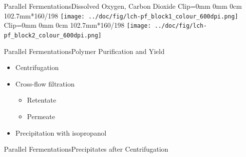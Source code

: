 \documentclass[mathserif]{beamer}
\begin{document}
\begin{frame}{Parallel Fermentations}{Dissolved Oxygen, Carbon Dioxide}
	\adjustbox
	{
		Clip=0mm 0mm 0cm 102.7mm*160/198
	}{
		\texttt{[image: ../doc/fig/lch-pf\_block1\_colour\_600dpi.png]}
	}
	\hfill
	\adjustbox
	{
		Clip=0mm 0mm 0cm 102.7mm*160/198
	}{
		\texttt{[image: ../doc/fig/lch-pf\_block2\_colour\_600dpi.png]}
	}
\end{frame}

\begin{frame}{Parallel Fermentations}{Polymer Purification and Yield}
	\begin{itemize}
		\item Centrifugation
		\item Cross-flow filtration
			\begin{itemize}
				\item Retentate
				\item Permeate
			\end{itemize}
		\item Precipitation with isopropanol
	\end{itemize}
\end{frame}

\begin{frame}{Parallel Fermentations}{Precipitates after Centrifugation}
	\begin{center}
	\end{center}
\end{frame}
\end{document}
